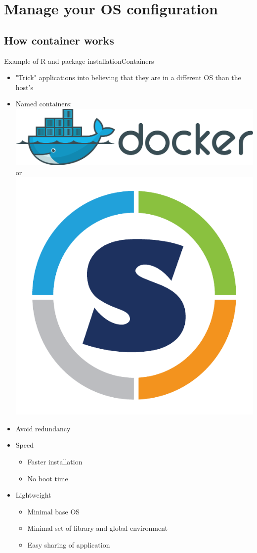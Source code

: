\section{Manage your OS configuration}
\subsection{How container works}

\begin{frame}{Example of R and package installation}{Containers}
\begin{itemize}[<+->]
	\item "Trick" applications into believing that they are in a different OS than the host’s
	\item Named containers: \includegraphics[scale=0.03]{images/docker_logo2.png} or \includegraphics[scale=0.1]{images/singularity_logo.pdf}
	\item Avoid redundancy
	\item<5-> Speed
	\begin{itemize}[<5->]
		\item Faster installation
		\item No boot time
	\end{itemize}
	\item<6-> Lightweight
	\begin{itemize}[<6->]
		\item Minimal base OS
		\item Minimal set of library and global environment 
		\item Easy sharing of application 
	\end{itemize}	
\end{itemize}


\end{frame}
